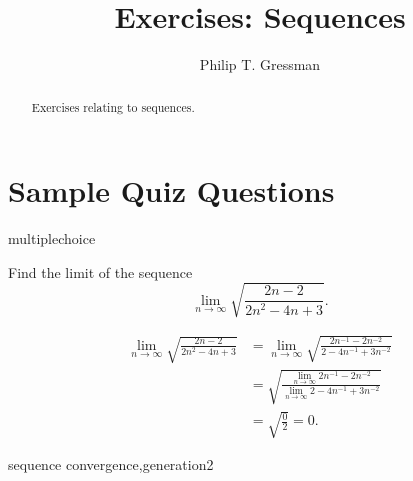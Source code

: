 \documentclass{ximera}
\title{Exercises: Sequences}
\author{Philip T. Gressman}
\begin{document}
\begin{abstract}
Exercises relating to sequences.
\end{abstract}
\maketitle


\section*{Sample Quiz Questions}

\begin{question}[SeqConvSQRT01]
\begin{type}
multiplechoice
\end{type}
Find the limit of the sequence
\[\lim_{n \rightarrow \infty} \sqrt{\frac{2n-2}{2n^2-4n+3}}.\] 
\begin{multiplechoice}
\end{multiplechoice}
\begin{feedback}
\[\begin{aligned}
\lim_{n \rightarrow \infty} \sqrt{\frac{2n-2}{2n^2-4n+3}} & = \lim_{n \rightarrow \infty} \sqrt{\frac{2n^{-1}-2n^{-2}}{2-4n^{-1}+3n^{-2}}} \\
 & = \sqrt{\frac{\lim_{n \rightarrow \infty} 2n^{-1}-2n^{-2}}{\lim_{n \rightarrow \infty} 2-4n^{-1}+3n^{-2}}} \\
 & = \sqrt{\frac{0}{2}} = 0. 
\end{aligned}\]
\end{feedback}
\begin{keywords}
sequence convergence,generation2
\end{keywords}
\end{question}
\end{document}
